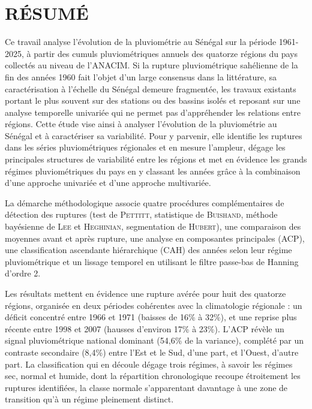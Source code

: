 \documentclass[12pt,a4paper]{report}
\begin{document}
\renewcommand{\listfigurename}{LISTE DES FIGURES}
\renewcommand{\listtablename}{LISTE DES TABLEAUX}
\renewcommand{\tablename}{Tableau}
\listoffigures
{}
\listoftables
{}
\chapter*{RÉSUMÉ}

Ce travail analyse l'évolution de la pluviométrie au Sénégal sur la période 1961-2025, à partir des cumuls pluviométriques annuels des quatorze régions du pays collectés au niveau de l'ANACIM. Si la rupture pluviométrique sahélienne de la fin des années 1960 fait l'objet d'un large consensus dans la littérature, sa caractérisation à l'échelle du Sénégal demeure fragmentée, les travaux existants portant le plus souvent sur des stations ou des bassins isolés et reposant sur une analyse temporelle univariée qui ne permet pas d'appréhender les relations entre régions. Cette étude vise ainsi à analyser l’évolution de la pluviométrie au Sénégal et à caractériser sa variabilité. Pour y parvenir, elle identifie les ruptures dans les séries pluviométriques régionales et en mesure l’ampleur, dégage les principales structures de variabilité entre les régions et met en évidence les grands régimes pluviométriques du pays en y classant les années grâce à la combinaison d’une approche univariée et d’une approche multivariée.

La démarche méthodologique associe quatre procédures complémentaires de détection des ruptures (test de \textsc{Pettitt}, statistique de \textsc{Buishand}, méthode bayésienne de \textsc{Lee} et \textsc{Heghinian}, segmentation de \textsc{Hubert}), une comparaison des moyennes avant et après rupture, une analyse en composantes principales (ACP), une classification ascendante hiérarchique (CAH) des années selon leur régime pluviométrique et un lissage temporel en utilisant le filtre passe-bas de Hanning d'ordre 2.

Les résultats mettent en évidence une rupture avérée pour huit des quatorze régions, organisée en deux périodes cohérentes avec la climatologie régionale : un déficit concentré entre 1966 et 1971 (baisses de 16\% à 32\%), et une reprise plus récente entre 1998 et 2007 (hausses d'environ 17\% à 23\%). L'ACP révèle un signal pluviométrique national dominant (54,6\% de la variance), complété par un contraste secondaire (8,4\%) entre l’Est et le Sud, d’une part, et l’Ouest, d’autre part. La classification qui en découle dégage trois régimes, à savoir les régimes sec, normal et humide, dont la répartition chronologique recoupe étroitement les ruptures identifiées, la classe normale s'apparentant davantage à une zone de transition qu'à un régime pleinement distinct.
\end{document}

